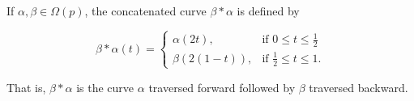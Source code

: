 If $\alpha, \beta \in \Omega(p)$, the concatenated curve $\beta * \alpha$ is defined by

$$\beta * \alpha(t) = \begin{cases} \alpha(2t), & \text{if } 0 \leq t \leq \frac{1}{2} \\[4pt] \beta(2(1 - t)), & \text{if } \frac{1}{2} \leq t \leq 1. \end{cases}$$

That is, $\beta * \alpha$ is the curve $\alpha$ traversed forward followed by $\beta$ traversed backward.
